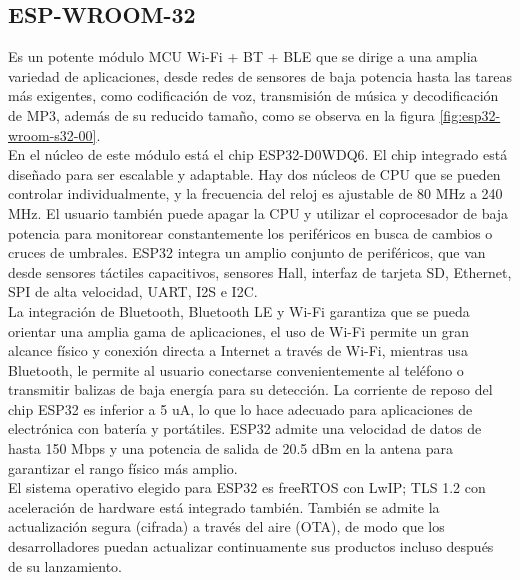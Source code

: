 \subsection{ESP-WROOM-32}

Es un potente módulo MCU Wi-Fi + BT + BLE que se dirige a una amplia variedad de aplicaciones, desde redes de sensores de baja potencia hasta las tareas más exigentes, como codificación de voz, transmisión de música y decodificación de MP3, además de su reducido tamaño, como se observa en la figura \ref{fig:esp32-wroom-s32-00}.\\

En el núcleo de este módulo está el chip ESP32-D0WDQ6. El chip integrado está diseñado para ser escalable y adaptable. Hay dos núcleos de CPU que se pueden controlar individualmente, y la frecuencia del reloj es ajustable de 80 MHz a 240 MHz. El usuario también puede apagar la CPU y utilizar el coprocesador de baja potencia para monitorear constantemente los periféricos en busca de cambios o cruces de umbrales. ESP32 integra un amplio conjunto de periféricos, que van desde sensores táctiles capacitivos, sensores Hall, interfaz de tarjeta SD, Ethernet, SPI de alta velocidad, UART, I2S e I2C.\\

La integración de Bluetooth, Bluetooth LE y Wi-Fi garantiza que se pueda orientar una amplia gama de aplicaciones, el uso de Wi-Fi permite un gran alcance físico y conexión directa a Internet a través de Wi-Fi, mientras usa Bluetooth, le permite al usuario conectarse convenientemente al teléfono o transmitir balizas de baja energía para su detección. La corriente de reposo del chip ESP32 es inferior a 5 uA, lo que lo hace adecuado para aplicaciones de electrónica con batería y portátiles. ESP32 admite una velocidad de datos de hasta 150 Mbps y una potencia de salida de 20.5 dBm en la antena para garantizar el rango físico más amplio.\\

El sistema operativo elegido para ESP32 es freeRTOS con LwIP; TLS 1.2 con aceleración de hardware está integrado también. También se admite la actualización segura (cifrada) a través del aire (OTA), de modo que los desarrolladores puedan actualizar continuamente sus productos incluso después de su lanzamiento.\cite{EW32}\\


